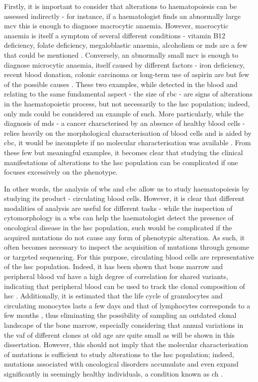 Firstly, it is important to consider that alterations to haematopoiesis can be assessed indirectly - for instance, if a haematologist finds an abnormally large \ac{mcv} this is enough to diagnose macrocytic anaemia. However, macrocytic anaemia is itself a symptom of several different conditions - vitamin B12 deficiency, folate deficiency, megaloblastic anaemia, alcoholism or \ac{mds} are a few that could be mentioned \cite{Nagao2017-bx}. Conversely, an abnormally small \ac{mcv} is enough to diagnose microcytic anaemia, itself caused by different factors - iron deficiency, recent blood donation, colonic carcinoma or long-term use of aspirin are but few of the possible causes \cite{Short2013-pz}. These two examples, while detected in the blood and relating to the same fundamental aspect - the size of \ac{rbc} - are signs of alterations in the haematopoietic process, but not necessarily to the \ac{hsc} population; indeed, only \ac{mds} could be considered an example of such. More particularly, while the diagnosis of \ac{mds} - a cancer characterised by an absence of healthy blood cells - relies heavily on the morphological characterisation of blood cells and is aided by \ac{cbc}, it would be incomplete if no molecular characterisation was available \cite{Invernizzi2015-ob}. From these few but meaningful examples, it becomes clear that studying the clinical manifestations of alterations to the \ac{hsc} population can be complicated if one focuses excessively on the phenotype.

In other words, the analysis of \ac{wbs} and \ac{cbc} allow us to study haematopoiesis by studying its product - circulating blood cells. However, it is clear that different modalities of analysis are useful for different tasks - while the inspection of cytomorphology in a \ac{wbs} can help the haematologist detect the presence of oncological disease in the \ac{hsc} population, such would be complicated if the acquired mutations do not cause any form of phenotypic alteration. As such, it often becomes necessary to inspect the acquisition of mutations through genome or targeted sequencing. For this purpose, circulating blood cells are representative of the \ac{hsc} population. Indeed, it has been shown that bone marrow and peripheral blood \ac{vaf} have a high degree of correlation for shared variants, indicating that peripheral blood can be used to track the clonal composition of \ac{hsc} \cite{Patkar2018-lp,Tong2015-oq,Coffey2019-rr}. Additionally, it is estimated that the life cycle of granulocytes and circulating monocytes lasts a few days and that of lymphocytes corresponds to a few months \cite{Resegotti1957-ut,Lahoz-Beneytez2016-zq,Patel2017-qx}, thus eliminating the possibility of sampling an outdated clonal landscape of the bone marrow, especially considering that annual variations in the \ac{vaf} of different clones at old age are quite small as will be shown in this dissertation. However, this should not imply that the molecular characterisation of mutations is sufficient to study alterations to the \ac{hsc} population; indeed, mutations associated with oncological disorders accumulate and even expand significantly in seemingly healthy individuals, a condition known as \ac{ch} \cite{Jaiswal2014-rl}. 

